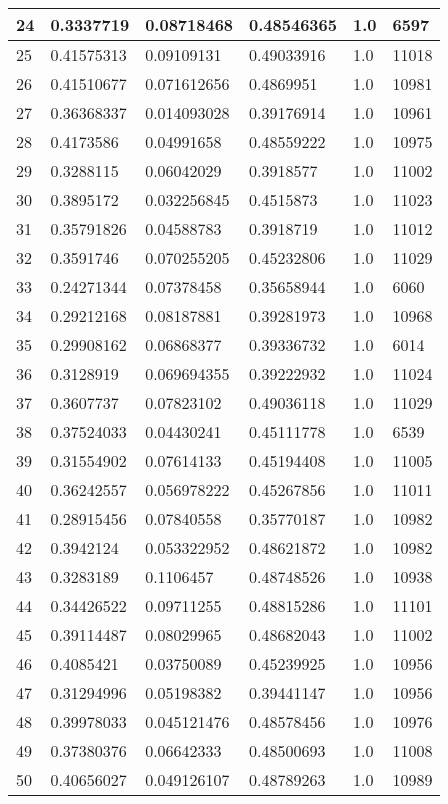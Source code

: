\begin{longtable}{|l|l|l|l|l|l|}
24 & 0.3337719 & 0.08718468 & 0.48546365 & 1.0 & 6597 \\ \hline 
25 & 0.41575313 & 0.09109131 & 0.49033916 & 1.0 & 11018 \\ \hline 
26 & 0.41510677 & 0.071612656 & 0.4869951 & 1.0 & 10981 \\ \hline 
27 & 0.36368337 & 0.014093028 & 0.39176914 & 1.0 & 10961 \\ \hline 
28 & 0.4173586 & 0.04991658 & 0.48559222 & 1.0 & 10975 \\ \hline 
29 & 0.3288115 & 0.06042029 & 0.3918577 & 1.0 & 11002 \\ \hline 
30 & 0.3895172 & 0.032256845 & 0.4515873 & 1.0 & 11023 \\ \hline 
31 & 0.35791826 & 0.04588783 & 0.3918719 & 1.0 & 11012 \\ \hline 
32 & 0.3591746 & 0.070255205 & 0.45232806 & 1.0 & 11029 \\ \hline 
33 & 0.24271344 & 0.07378458 & 0.35658944 & 1.0 & 6060 \\ \hline 
34 & 0.29212168 & 0.08187881 & 0.39281973 & 1.0 & 10968 \\ \hline 
35 & 0.29908162 & 0.06868377 & 0.39336732 & 1.0 & 6014 \\ \hline 
36 & 0.3128919 & 0.069694355 & 0.39222932 & 1.0 & 11024 \\ \hline 
37 & 0.3607737 & 0.07823102 & 0.49036118 & 1.0 & 11029 \\ \hline 
38 & 0.37524033 & 0.04430241 & 0.45111778 & 1.0 & 6539 \\ \hline 
39 & 0.31554902 & 0.07614133 & 0.45194408 & 1.0 & 11005 \\ \hline 
40 & 0.36242557 & 0.056978222 & 0.45267856 & 1.0 & 11011 \\ \hline 
41 & 0.28915456 & 0.07840558 & 0.35770187 & 1.0 & 10982 \\ \hline 
42 & 0.3942124 & 0.053322952 & 0.48621872 & 1.0 & 10982 \\ \hline 
43 & 0.3283189 & 0.1106457 & 0.48748526 & 1.0 & 10938 \\ \hline 
44 & 0.34426522 & 0.09711255 & 0.48815286 & 1.0 & 11101 \\ \hline 
45 & 0.39114487 & 0.08029965 & 0.48682043 & 1.0 & 11002 \\ \hline 
46 & 0.4085421 & 0.03750089 & 0.45239925 & 1.0 & 10956 \\ \hline 
47 & 0.31294996 & 0.05198382 & 0.39441147 & 1.0 & 10956 \\ \hline 
48 & 0.39978033 & 0.045121476 & 0.48578456 & 1.0 & 10976 \\ \hline 
49 & 0.37380376 & 0.06642333 & 0.48500693 & 1.0 & 11008 \\ \hline 
50 & 0.40656027 & 0.049126107 & 0.48789263 & 1.0 & 10989 \\ \hline 
\end{longtable}